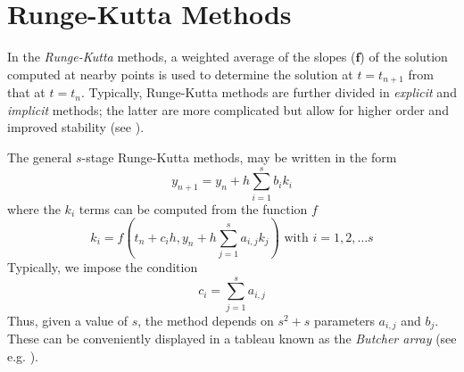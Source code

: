 \section{Runge-Kutta Methods}\label{sec:runge-kutta}

In the \emph{Runge-Kutta} methods, a weighted average of the slopes ($\bm{f}$) of 
the solution computed at nearby points is used to determine the solution at 
$t = t_{n+1}$ from that at $t = t_n$. Typically, Runge-Kutta methods are further 
divided in \emph{explicit} and \emph{implicit} methods; the latter are more complicated 
but allow for higher order and improved stability (see \cite{Griffiths2010}).

The general $s$-stage Runge-Kutta methods, may be written in the form
\begin{equation}\label{eq:grif95}
    y_{n+1} = y_n + h \sum_{i=1}^{s} b_i k_i 
\end{equation}
where the $k_i$ terms can be computed from the function $f$
\begin{equation}\label{eq:grif96}
    k_i = f \left( t_n + c_i h , y_n + h \sum_{j=1}^{s} a_{i,j} k_j \right) \text{ with } i = 1,2,\dots s
\end{equation}
Typically, we impose the condition
\begin{equation}
    c_i = \sum_{j=1}^{s} a_{i,j}
\end{equation}
Thus, given a value of $s$, the method depends on $s^2 + s$ parameters $a_{i,j}$ and $b_j$.
These can be conveniently displayed in a tableau known as the \emph{Butcher array} 
(see e.g. \cite{Butcher2016}).

